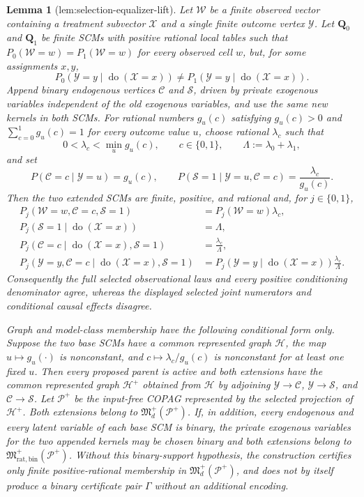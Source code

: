 \documentclass{article}
\newtheorem{lemma}{Lemma}
\begin{document}
\begin{lemma}[lem:selection-equalizer-lift]\label{lem:selection-equalizer-lift}
Let \(\mathcal W\) be a finite observed vector containing a treatment subvector \(\mathcal X\) and a single finite outcome vertex \(\mathcal Y\). Let \(\mathbf Q_0\) and \(\mathbf Q_1\) be finite SCMs with positive rational local tables such that \(P_0(\mathcal W=w)=P_1(\mathcal W=w)\) for every observed cell \(w\), but, for some assignments \(x,y\),
\[
 P_0(\mathcal Y=y\mid\operatorname{do}(\mathcal X=x))
 \ne
 P_1(\mathcal Y=y\mid\operatorname{do}(\mathcal X=x)).
\]
Append binary endogenous vertices \(\mathcal C\) and \(\mathcal S\), driven by private exogenous variables independent of the old exogenous variables, and use the same new kernels in both SCMs. For rational numbers \(g_u(c)\) satisfying \(g_u(c)>0\) and \(\sum_{c=0}^1g_u(c)=1\) for every outcome value \(u\), choose rational \(\lambda_c\) such that
\[
 0<\lambda_c<\min_u g_u(c),
 \qquad c\in\{0,1\},
 \qquad
 \Lambda:=\lambda_0+\lambda_1,
\]
and set
\[
 P(\mathcal C=c\mid\mathcal Y=u)=g_u(c),
 \qquad
 P(\mathcal S=1\mid\mathcal Y=u,\mathcal C=c)
   =\frac{\lambda_c}{g_u(c)}.
\]
Then the two extended SCMs are finite, positive, and rational and, for \(j\in\{0,1\}\),
\[
\begin{aligned}
 P_j(\mathcal W=w,\mathcal C=c,\mathcal S=1)
   &=P_j(\mathcal W=w)\lambda_c,\\
 P_j(\mathcal S=1\mid\operatorname{do}(\mathcal X=x))
   &=\Lambda,\\
 P_j(\mathcal C=c\mid\operatorname{do}(\mathcal X=x),\mathcal S=1)
   &=\frac{\lambda_c}{\Lambda},\\
 P_j(\mathcal Y=y,\mathcal C=c\mid
       \operatorname{do}(\mathcal X=x),\mathcal S=1)
   &=P_j(\mathcal Y=y\mid\operatorname{do}(\mathcal X=x))
     \frac{\lambda_c}{\Lambda}.
\end{aligned}
\]
Consequently the full selected observational laws and every positive conditioning denominator agree, whereas the displayed selected joint numerators and conditional causal effects disagree.

Graph and model-class membership have the following conditional form only. Suppose the two base SCMs have a common represented graph \(\mathcal H\), the map \(u\mapsto g_u(\cdot)\) is nonconstant, and \(c\mapsto\lambda_c/g_u(c)\) is nonconstant for at least one fixed \(u\). Then every proposed parent is active and both extensions have the common represented graph \(\mathcal H^+\) obtained from \(\mathcal H\) by adjoining \(\mathcal Y\to\mathcal C\), \(\mathcal Y\to\mathcal S\), and \(\mathcal C\to\mathcal S\). Let \(\mathcal P^+\) be the input-free COPAG represented by the selected projection of \(\mathcal H^+\). Both extensions belong to \(\mathfrak M_d^+(\mathcal P^+)\). If, in addition, every endogenous and every latent variable of each base SCM is binary, the private exogenous variables for the two appended kernels may be chosen binary and both extensions belong to \(\mathfrak M_{\mathrm{rat,bin}}^+(\mathcal P^+)\). Without this binary-support hypothesis, the construction certifies only finite positive-rational membership in \(\mathfrak M_d^+(\mathcal P^+)\), and does not by itself produce a binary certificate pair \(\Gamma\) without an additional encoding.
\end{lemma}
\end{document}
